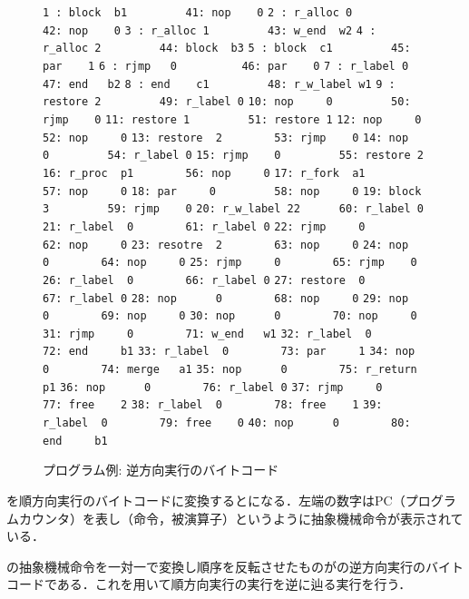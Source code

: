 \documentclass[submit,PRO]{ipsj}
\def\|{\verb|}
\begin{document}
\begin{figure}[tb]
\vbox{
\hbox{\|1 : block  b1         41: nop    0|}
\hbox{\|2 : r_alloc 0         42: nop    0|}
\hbox{\|3 : r_alloc 1         43: w_end  w2|}
\hbox{\|4 : r_alloc 2         44: block  b3|}
\hbox{\|5 : block  c1         45: par    1|}
\hbox{\|6 : rjmp   0          46: par    0|}
\hbox{\|7 : r_label 0          47: end   b2|}
\hbox{\|8 : end    c1         48: r_w_label w1|}
\hbox{\|9 : restore 2         49: r_label 0|}
\hbox{\|10: nop     0         50: rjmp    0|}
\hbox{\|11: restore 1         51: restore 1|}
\hbox{\|12: nop     0         52: nop     0|}
\hbox{\|13: restore  2        53: rjmp    0|}
\hbox{\|14: nop     0         54: r_label 0|}
\hbox{\|15: rjmp    0         55: restore 2|}
\hbox{\|16: r_proc  p1        56: nop     0|}
\hbox{\|17: r_fork  a1        57: nop     0|}
\hbox{\|18: par     0         58: nop     0|}
\hbox{\|19: block   3         59: rjmp    0|}
\hbox{\|20: r_w_label 22      60: r_label 0|}
\hbox{\|21: r_label  0        61: r_label 0|}
\hbox{\|22: rjmp     0        62: nop     0|}
\hbox{\|23: resotre  2        63: nop     0|}
\hbox{\|24: nop      0        64: nop     0|}
\hbox{\|25: rjmp     0        65: rjmp    0|}
\hbox{\|26: r_label  0        66: r_label 0|}
\hbox{\|27: restore  0        67: r_label 0|}
\hbox{\|28: nop      0        68: nop     0|}
\hbox{\|29: nop      0        69: nop     0|}
\hbox{\|30: nop      0        70: nop     0|}
\hbox{\|31: rjmp     0        71: w_end   w1|}
\hbox{\|32: r_label  0        72: end     b1|}
\hbox{\|33: r_label  0        73: par     1|}
\hbox{\|34: nop      0        74: merge   a1|} 
\hbox{\|35: nop      0        75: r_return p1|}
\hbox{\|36: nop      0        76: r_label 0|}
\hbox{\|37: rjmp     0        77: free    2|}
\hbox{\|38: r_label  0        78: free    1|}
\hbox{\|39: r_label  0        79: free    0|}
\hbox{\|40: nop      0        80: end     b1|}
}
\centerline{}
\caption{プログラム例: 逆方向実行のバイトコード}
\label{fig:backward}
\end{figure}



を順方向実行のバイトコードに変換するとになる．左端の数字はPC（プログラムカウンタ）を表し（命令，被演算子）というように抽象機械命令が表示されている．

の抽象機械命令を一対一で変換し順序を反転させたものがの逆方向実行のバイトコードである．これを用いて順方向実行の実行を逆に辿る実行を行う．
\end{document}
